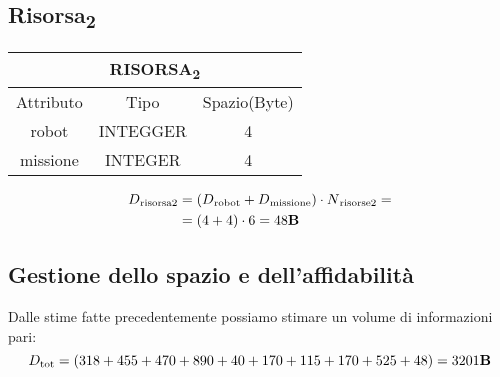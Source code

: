 \subsection{Risorsa\textsubscript{2}}
\begin{tabular}{|c|c|c|}
  \hline
  \multicolumn{3}{|c|}{\textbf{RISORSA\textsubscript{2}}}\\
  \hline
  Attributo & Tipo & Spazio(Byte) \\
  \hline
  robot & INTEGGER & 4 \\
  missione & INTEGER & 4 \\
  \hline
\end{tabular}
\begin{equation}
  \begin{aligned}
    D{\text{\textsubscript{risorsa2}}}&=(D{\text{\textsubscript{robot}}} + D{\text{\textsubscript{missione}}}) \cdot N{\text{\textsubscript{risorse2}}}=\\
    &=(4+4)\cdot 6 = 48\text{\textbf{B}}\\
  \end{aligned}
\end{equation}
\subsection{Gestione dello spazio e dell'affidabilità}
Dalle stime fatte precedentemente possiamo stimare un volume di informazioni pari:
\begin{equation}
  D_{\text{tot}}=(318+455+470+890+40+170+115+170+525+48)= 3201\text{\textbf{B}}\\
\end{equation}

